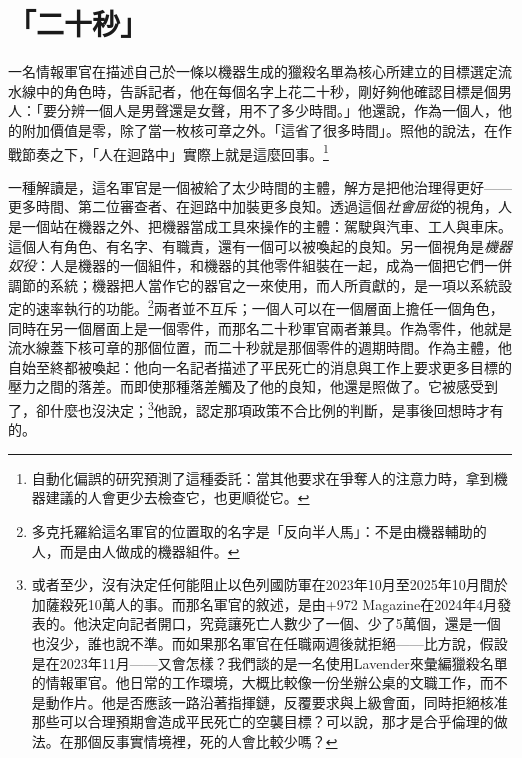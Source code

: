 \chapter{「二十秒」}
\label{sec:1}
一名情報軍官在描述自己於一條以機器生成的獵殺名單為核心所建立的目標選定流水線中的角色時，告訴記者，他在每個名字上花二十秒，剛好夠他確認目標是個男人：「要分辨一個人是男聲還是女聲，用不了多少時間。」他還說，作為一個人，他的附加價值是零，除了當一枚核可章之外。「這省了很多時間」\autocite{abraham2024lavender}。照他的說法，在作戰節奏之下，「人在迴路中」實際上就是這麼回事。\footnote{自動化偏誤的研究預測了這種委託：當其他要求在爭奪人的注意力時，拿到機器建議的人會更少去檢查它，也更順從它\autocite{parasuraman2010complacency}。}

一種解讀是，這名軍官是一個被給了太少時間的主體，解方是把他治理得更好——更多時間、第二位審查者、在迴路中加裝更多良知。透過這個\emph{社會屈從}的視角，人是一個站在機器之外、把機器當成工具來操作的主體：駕駛與汽車、工人與車床。這個人有角色、有名字、有職責，還有一個可以被喚起的良知。另一個視角是\emph{機器奴役}：人是機器的一個組件，和機器的其他零件組裝在一起，成為一個把它們一併調節的系統；機器把人當作它的器官之一來使用，而人所貢獻的，是一項以系統設定的速率執行的功能。\footnote{多克托羅給這名軍官的位置取的名字是「反向半人馬」：不是由機器輔助的人，而是由人做成的機器組件\autocite{doctorow2026reversecentaur}。}兩者並不互斥；一個人可以在一個層面上擔任一個角色，同時在另一個層面上是一個零件\autocite[高原13，〈The Apparatus of Capture〉：當人類本身就是一部機器的構成部件，這部機器由他們彼此之間以及與其他事物共同組成，並受一個更高的統一體控制和指揮時，就有了奴役；當這個更高的統一體把人構成為一個主體，連結到一個新的外部客體——這個客體可以是一隻動物、一件工具，甚至是一部機器——時，就有了屈從]{deleuze1987plateaus}，而那名二十秒軍官兩者兼具。作為零件，他就是流水線蓋下核可章的那個位置，而二十秒就是那個零件的週期時間。作為主體，他自始至終都被喚起：他向一名記者描述了平民死亡的消息與工作上要求更多目標的壓力之間的落差。而即使那種落差觸及了他的良知，他還是照做了。它被感受到了，卻什麼也沒決定；\footnote{或者至少，沒有決定任何能阻止以色列國防軍在2023年10月至2025年10月間於加薩殺死10萬人的事\autocite{gomezugarte2025uncertainty,acosta2026gaza,economist2025gaza}。而那名軍官的敘述，是由+972 Magazine在2024年4月發表的。他決定向記者開口，究竟讓死亡人數少了一個、少了5萬個，還是一個也沒少，誰也說不準。而如果那名軍官在任職兩週後就拒絕——比方說，假設是在2023年11月——又會怎樣？我們談的是一名使用Lavender來彙編獵殺名單的情報軍官。他日常的工作環境，大概比較像一份坐辦公桌的文職工作，而不是動作片。他是否應該一路沿著指揮鏈，反覆要求與上級會面，同時拒絕核准那些可以合理預期會造成平民死亡的空襲目標？可以說，那才是合乎倫理的做法。在那個反事實情境裡，死的人會比較少嗎？}他說，認定那項政策不合比例的判斷，是事後回想時才有的。

